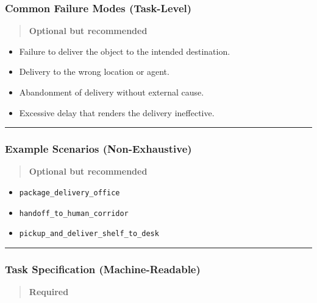 \documentclass[utf8]{frontiers_suppmat} %
\providecommand{\tightlist}{%
  \setlength{\itemsep}{0pt}\setlength{\parskip}{0pt}}
\begin{document}
\subsubsection{Common Failure Modes
(Task-Level)}\label{common-failure-modes-task-level}

\begin{quote}
\textbf{Optional but recommended}
\end{quote}

\begin{itemize}
\tightlist
\item
  Failure to deliver the object to the intended destination.
\item
  Delivery to the wrong location or agent.
\item
  Abandonment of delivery without external cause.
\item
  Excessive delay that renders the delivery ineffective.
\end{itemize}

\begin{center}\rule{0.5\linewidth}{0.5pt}\end{center}

\subsubsection{Example Scenarios
(Non-Exhaustive)}\label{example-scenarios-non-exhaustive}

\begin{quote}
\textbf{Optional but recommended}
\end{quote}

\begin{itemize}
\tightlist
\item
  \texttt{package\_delivery\_office}
\item
  \texttt{handoff\_to\_human\_corridor}
\item
  \texttt{pickup\_and\_deliver\_shelf\_to\_desk}
\end{itemize}

\begin{center}\rule{0.5\linewidth}{0.5pt}\end{center}

\subsubsection{Task Specification
(Machine-Readable)}\label{task-specification-machine-readable}

\begin{quote}
\textbf{Required}
\end{quote}
\end{document}
